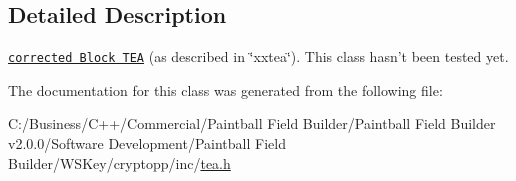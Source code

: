 \subsection{Detailed Description}
\href{http://www.weidai.com/scan-mirror/cs.html#TEA}{\tt corrected Block TEA} (as described in \char`\"{}xxtea\char`\"{}). This class hasn't been tested yet. 

The documentation for this class was generated from the following file:\begin{DoxyCompactItemize}
\item 
C:/Business/C++/Commercial/Paintball Field Builder/Paintball Field Builder v2.0.0/Software Development/Paintball Field Builder/WSKey/cryptopp/inc/\hyperlink{tea_8h}{tea.h}\end{DoxyCompactItemize}
